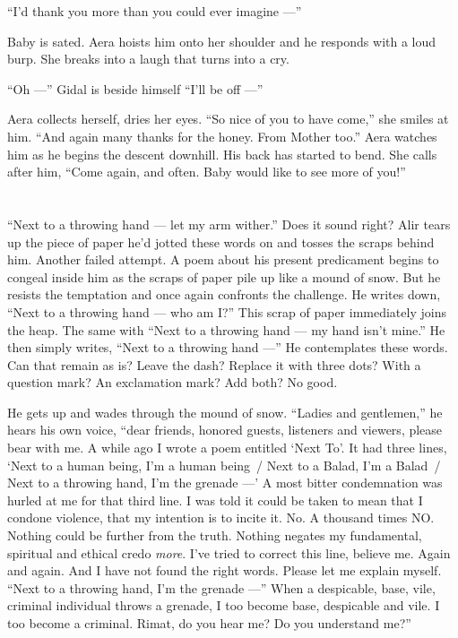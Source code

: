 \documentclass[twoside,11pt,openany]{book}
\begin{document}
``I'd thank you more than you could ever imagine ---''

Baby is sated. Aera hoists him onto her shoulder and he responds with a loud burp. She breaks into a laugh that turns
into a cry.

``Oh ---'' Gidal is beside himself ``I'll be off ---''

Aera collects herself, dries her eyes. ``So nice of you to have come,'' she smiles at him.
``And again many thanks for the honey. From Mother too.'' Aera watches him as he begins the
descent downhill.  His back has started to bend. She calls after him, ``Come again, and often. Baby would
like to see more of you!''


\chapter{}

``Next to a throwing hand --- let my arm wither.'' Does it sound right? Alir tears up the piece of paper he'd
jotted these words on{ }and tosses the scraps behind him. Another failed
attempt.  A poem about his present predicament begins to congeal inside him as the scraps of paper pile up like a mound
of snow. But he resists the temptation and once again confronts the challenge. He writes down, ``Next to a
throwing hand --- who am I?'' This scrap of paper immediately joins the heap. The same with
``Next to a throwing hand --- my hand isn't mine.'' He then
simply{ }writes, ``Next to a throwing hand ---'' He
contemplates these words. Can that remain as is? Leave the dash?  Replace it with three dots? With a question mark?
An exclamation mark? Add both? No good.

He gets up and wades through the mound of snow. ``Ladies and gentlemen,'' he hears his own
voice, ``dear friends, honored guests, listeners and viewers, please bear with me. A while ago I wrote a
poem entitled `Next To'. It had three lines, `Next to a human being, I'm a
human being~/ Next to a Balad, I'm a Balad~/ Next to a throwing hand, I'm the grenade ---' A most bitter
condemnation was hurled at me for that third line. I was told it could be taken to mean that I condone violence, that
my intention is to incite it. No. A thousand times NO.  Nothing could be further from the truth. Nothing negates my
fundamental, spiritual and ethical credo \textit{more}. I've tried to correct this line, believe me. Again and again.
And I have not found the right words. Please let me explain myself. ``Next to a throwing hand, I'm the
grenade ---'' When a despicable, base, vile, criminal individual throws a grenade, I too become base,
despicable{ }and vile. I too become a criminal. Rimat, do you hear me? Do you
understand me?''
\end{document}
